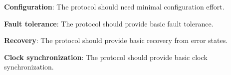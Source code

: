 \begin{req}
\label{req:ulftrtp:configuration}
\textbf{Configuration}: The protocol should need minimal configuration effort.
\end{req}

\begin{req}
\label{req:ulftrtp:ft}
\textbf{Fault tolerance}: The protocol should provide basic fault tolerance.
\end{req}

\begin{req}
\label{req:ulftrtp:recovery}
\textbf{Recovery}: The protocol should provide basic recovery from error states.
\end{req}

\begin{req}
\label{req:ulftrtp:clocksync}
\textbf{Clock synchronization}: The protocol should provide basic clock synchronization.
\end{req}
